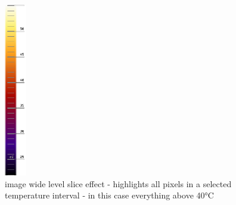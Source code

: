 \documentclass[12pt,twoside,a4paper,titlepage]{report}
\begin{document}
\begin{figure}[ht]
 \includegraphics[width=9.5mm, keepaspectratio=true width=10cm]{img/FLIR_P60_orig_scale}
 \caption{image wide level slice effect - highlights all pixels in a selected temperature interval - in this case everything above 40°C}
 \label{fig:tools-export-level-slice}
\end{figure}
\end{document}
